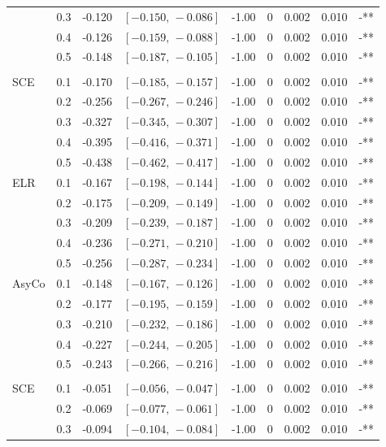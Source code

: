 \begin{small}
\begin{longtable}{llrrrrrrl}
 & 0.3 & -0.120 & $[-0.150,\,-0.086]$ & -1.00 & 0 & 0.002 & 0.010 & -** \\
 & 0.4 & -0.126 & $[-0.159,\,-0.088]$ & -1.00 & 0 & 0.002 & 0.010 & -** \\
 & 0.5 & -0.148 & $[-0.187,\,-0.105]$ & -1.00 & 0 & 0.002 & 0.010 & -** \\
\addlinespace
\multicolumn{9}{l}{\textit{Macro F1}} \\
SCE & 0.1 & -0.170 & $[-0.185,\,-0.157]$ & -1.00 & 0 & 0.002 & 0.010 & -** \\
 & 0.2 & -0.256 & $[-0.267,\,-0.246]$ & -1.00 & 0 & 0.002 & 0.010 & -** \\
 & 0.3 & -0.327 & $[-0.345,\,-0.307]$ & -1.00 & 0 & 0.002 & 0.010 & -** \\
 & 0.4 & -0.395 & $[-0.416,\,-0.371]$ & -1.00 & 0 & 0.002 & 0.010 & -** \\
 & 0.5 & -0.438 & $[-0.462,\,-0.417]$ & -1.00 & 0 & 0.002 & 0.010 & -** \\
ELR & 0.1 & -0.167 & $[-0.198,\,-0.144]$ & -1.00 & 0 & 0.002 & 0.010 & -** \\
 & 0.2 & -0.175 & $[-0.209,\,-0.149]$ & -1.00 & 0 & 0.002 & 0.010 & -** \\
 & 0.3 & -0.209 & $[-0.239,\,-0.187]$ & -1.00 & 0 & 0.002 & 0.010 & -** \\
 & 0.4 & -0.236 & $[-0.271,\,-0.210]$ & -1.00 & 0 & 0.002 & 0.010 & -** \\
 & 0.5 & -0.256 & $[-0.287,\,-0.234]$ & -1.00 & 0 & 0.002 & 0.010 & -** \\
AsyCo & 0.1 & -0.148 & $[-0.167,\,-0.126]$ & -1.00 & 0 & 0.002 & 0.010 & -** \\
 & 0.2 & -0.177 & $[-0.195,\,-0.159]$ & -1.00 & 0 & 0.002 & 0.010 & -** \\
 & 0.3 & -0.210 & $[-0.232,\,-0.186]$ & -1.00 & 0 & 0.002 & 0.010 & -** \\
 & 0.4 & -0.227 & $[-0.244,\,-0.205]$ & -1.00 & 0 & 0.002 & 0.010 & -** \\
 & 0.5 & -0.243 & $[-0.266,\,-0.216]$ & -1.00 & 0 & 0.002 & 0.010 & -** \\
\addlinespace
\multicolumn{9}{l}{\textit{Macro AUC}} \\
SCE & 0.1 & -0.051 & $[-0.056,\,-0.047]$ & -1.00 & 0 & 0.002 & 0.010 & -** \\
 & 0.2 & -0.069 & $[-0.077,\,-0.061]$ & -1.00 & 0 & 0.002 & 0.010 & -** \\
 & 0.3 & -0.094 & $[-0.104,\,-0.084]$ & -1.00 & 0 & 0.002 & 0.010 & -** \\

\end{longtable}
\end{small}
